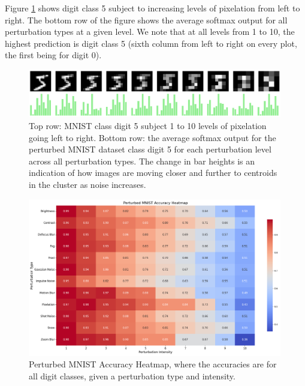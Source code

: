 Figure \ref{fig:Pixelation_Digit_5_images_histogramsx10_plus_softmax} shows digit class 5 subject to increasing levels of pixelation from left to right. The bottom row of the figure shows the average softmax output for all perturbation types at a given level. We note that at all levels from 1 to 10, the highest prediction is digit class 5 (sixth column from left to right on every plot, the first being for digit 0).
\begin{figure}[h!]
    \centering
    \includegraphics[width=0.99\textwidth]{Figures/Pixelation_Digit_5_images_histogramsx10_plus_softmax.png}   %
    \caption{Top row: MNIST class digit 5 subject 1 to 10 levels of pixelation going left to right. Bottom row: the average softmax output for the perturbed MNIST dataset class digit 5 for each perturbation level across all perturbation types. The change in bar heights is an indication of how images are moving closer and further to centroids in the cluster as noise increases.}\label{fig:Pixelation_Digit_5_images_histogramsx10_plus_softmax}
\end{figure}



\begin{figure}[h!]
    \centering
    \includegraphics[width=0.99\textwidth]{Figures/PerturbedMNISTAccuracyHeatmap.png}   %
    \caption{Perturbed MNIST Accuracy Heatmap, where the accuracies are for all digit classes, given a perturbation type and intensity.}
    \label{fig:PerturbedMNISTAccuracyHeatmap}
\end{figure}

